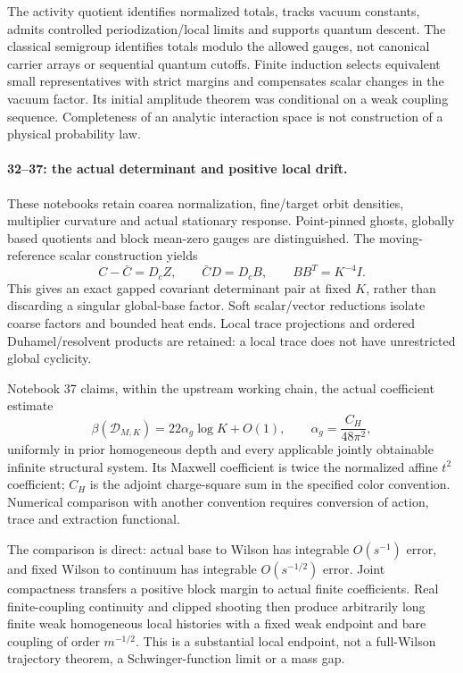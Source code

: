 \documentclass[11pt]{article}
\theoremstyle{remark}
\begin{document}
The activity quotient identifies normalized
totals, tracks vacuum constants, admits
controlled periodization/local limits and
supports quantum descent. The classical
semigroup identifies totals modulo the
allowed gauges, not canonical carrier arrays
or sequential quantum cutoffs.
Finite induction selects equivalent small
representatives with strict margins and
compensates scalar changes in the vacuum
factor. Its initial amplitude theorem was
conditional on a weak coupling sequence.
Completeness of an analytic interaction
space is not construction of a physical
probability law.

\paragraph{32--37: the actual determinant and positive local drift.}
These notebooks retain coarea normalization,
fine/target orbit densities, multiplier
curvature and actual stationary response.
Point-pinned ghosts, globally based quotients
and block mean-zero gauges are distinguished.
The moving-reference scalar construction yields
\[
 C-\bar C=D_cZ,\qquad \bar C D=D_cB,
 \qquad BB^T=K^{-4}I .
\]
This gives an exact gapped covariant
determinant pair at fixed \(K\), rather
than discarding a singular global-base
factor. Soft scalar/vector reductions
isolate coarse factors and bounded heat
ends. Local trace projections and ordered
Duhamel/resolvent products are retained:
a local trace does not have unrestricted
global cyclicity.

Notebook 37 claims, within the upstream
working chain, the actual coefficient estimate
\[
 \beta(\mathcal D_{M,K})
   =22\alpha_g\log K+O(1),\qquad
 \alpha_g=\frac{C_H}{48\pi^2},
\]
uniformly in prior homogeneous depth and
every applicable jointly obtainable
infinite structural system. Its Maxwell
coefficient is twice the normalized
affine \(t^2\) coefficient; \(C_H\) is
the adjoint charge-square sum in the
specified color convention. Numerical
comparison with another convention
requires conversion of action, trace
and extraction functional.

The comparison is direct: actual base
to Wilson has integrable \(O(s^{-1})\)
error, and fixed Wilson to continuum
has integrable \(O(s^{-1/2})\) error.
Joint compactness transfers a positive
block margin to actual finite coefficients.
Real finite-coupling continuity and
clipped shooting then produce arbitrarily
long finite weak homogeneous local
histories with a fixed weak endpoint
and bare coupling of order \(m^{-1/2}\).
This is a substantial local endpoint,
not a full-Wilson trajectory theorem,
a Schwinger-function limit or a mass gap.
\end{document}
